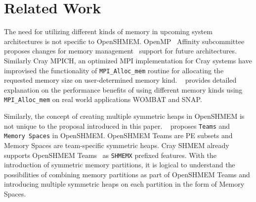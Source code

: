 \section{Related Work}
\label{src:relate}
The need for utilizing different kinds of memory %
in upcoming system architectures is not specific to
OpenSHMEM. %
OpenMP~\cite{openmp} Affinity subcommittee proposes changes
for memory management~\cite{omp-tr5} support for future architectures.
Similarly Cray MPICH, an optimized MPI
implementation for Cray systems have improvised the functionality of
\texttt{MPI\_Alloc\_mem} routine for allocating the requested
memory size on user-determined
memory kind. ~\citeauthor{cug17-krishna}
provides detailed explanation on the performance benefits of using
different
memory kinds using \texttt{MPI\_Alloc\_mem} on real world
applications WOMBAT and SNAP.

Similarly, the concept of creating multiple symmetric heaps in OpenSHMEM
is not unique to the proposal introduced in this paper.
~\citeauthor{osm-spaces} proposes \texttt{Teams} and
\texttt{Memory Spaces} in OpenSHMEM.
OpenSHMEM Teams are PE subsets and Memory Spaces are team-specific
symmetric heaps. Cray SHMEM already supports OpenSHMEM
Teams~\cite{knaak2015}
as \texttt{SHMEMX} prefixed features. With the introduction of
symmetric memory partitions, it
is logical to understand the possibilities of combining
memory partitions as part of OpenSHMEM Teams and introducing multiple
symmetric heaps on each partition in the form of Memory Spaces.
